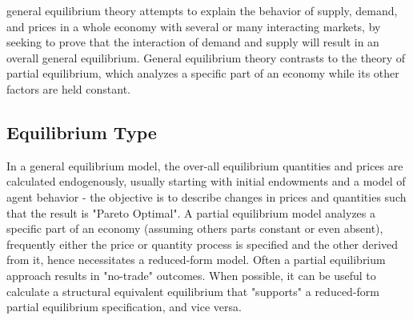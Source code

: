 \documentclass[11pt]{article}
\begin{document}
general equilibrium theory attempts to explain the behavior of supply, demand, and prices in a whole economy with several or many interacting markets, by seeking to prove that the interaction of demand and supply will result in an overall general equilibrium. General equilibrium theory contrasts to the theory of partial equilibrium, which analyzes a specific part of an economy while its other factors are held constant.

\subsection{Equilibrium Type}
In a general equilibrium model, the over-all equilibrium quantities and prices are calculated endogenously, usually starting with initial endowments and a model of agent behavior - the objective is to describe changes in prices and quantities such that the result is "Pareto Optimal". A partial equilibrium model analyzes a specific part of an economy (assuming others parts constant or even absent), frequently either the price or quantity process is specified and the other derived from it, hence necessitates a reduced-form model.  Often a partial equilibrium approach results in "no-trade" outcomes.  When possible, it can be useful to calculate a structural equivalent equilibrium that "supports" a reduced-form partial equilibrium specification, and vice versa.  
\end{document}
